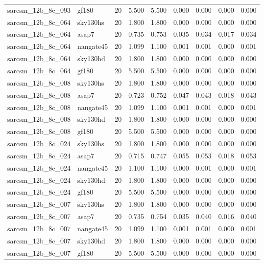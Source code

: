 \begin{tabular}{llrrrrrrr}
sarcsm\_12b\_8c\_093 & gf180 & 20 & 5.500 & 5.500 & 0.000 & 0.000 & 0.000 & 0.000 \\
sarcsm\_12b\_8c\_064 & sky130hs & 20 & 1.800 & 1.800 & 0.000 & 0.000 & 0.000 & 0.000 \\
sarcsm\_12b\_8c\_064 & asap7 & 20 & 0.735 & 0.753 & 0.035 & 0.034 & 0.017 & 0.034 \\
sarcsm\_12b\_8c\_064 & nangate45 & 20 & 1.099 & 1.100 & 0.001 & 0.001 & 0.000 & 0.001 \\
sarcsm\_12b\_8c\_064 & sky130hd & 20 & 1.800 & 1.800 & 0.000 & 0.000 & 0.000 & 0.000 \\
sarcsm\_12b\_8c\_064 & gf180 & 20 & 5.500 & 5.500 & 0.000 & 0.000 & 0.000 & 0.000 \\
sarcsm\_12b\_8c\_008 & sky130hs & 20 & 1.800 & 1.800 & 0.000 & 0.000 & 0.000 & 0.000 \\
sarcsm\_12b\_8c\_008 & asap7 & 20 & 0.723 & 0.752 & 0.047 & 0.043 & 0.018 & 0.043 \\
sarcsm\_12b\_8c\_008 & nangate45 & 20 & 1.099 & 1.100 & 0.001 & 0.001 & 0.000 & 0.001 \\
sarcsm\_12b\_8c\_008 & sky130hd & 20 & 1.800 & 1.800 & 0.000 & 0.000 & 0.000 & 0.000 \\
sarcsm\_12b\_8c\_008 & gf180 & 20 & 5.500 & 5.500 & 0.000 & 0.000 & 0.000 & 0.000 \\
sarcsm\_12b\_8c\_024 & sky130hs & 20 & 1.800 & 1.800 & 0.000 & 0.000 & 0.000 & 0.000 \\
sarcsm\_12b\_8c\_024 & asap7 & 20 & 0.715 & 0.747 & 0.055 & 0.053 & 0.018 & 0.053 \\
sarcsm\_12b\_8c\_024 & nangate45 & 20 & 1.100 & 1.100 & 0.000 & 0.001 & 0.000 & 0.001 \\
sarcsm\_12b\_8c\_024 & sky130hd & 20 & 1.800 & 1.800 & 0.000 & 0.000 & 0.000 & 0.000 \\
sarcsm\_12b\_8c\_024 & gf180 & 20 & 5.500 & 5.500 & 0.000 & 0.000 & 0.000 & 0.000 \\
sarcsm\_12b\_8c\_007 & sky130hs & 20 & 1.800 & 1.800 & 0.000 & 0.000 & 0.000 & 0.000 \\
sarcsm\_12b\_8c\_007 & asap7 & 20 & 0.735 & 0.754 & 0.035 & 0.040 & 0.016 & 0.040 \\
sarcsm\_12b\_8c\_007 & nangate45 & 20 & 1.099 & 1.100 & 0.001 & 0.001 & 0.000 & 0.001 \\
sarcsm\_12b\_8c\_007 & sky130hd & 20 & 1.800 & 1.800 & 0.000 & 0.000 & 0.000 & 0.000 \\
sarcsm\_12b\_8c\_007 & gf180 & 20 & 5.500 & 5.500 & 0.000 & 0.000 & 0.000 & 0.000 \\

\end{tabular}
